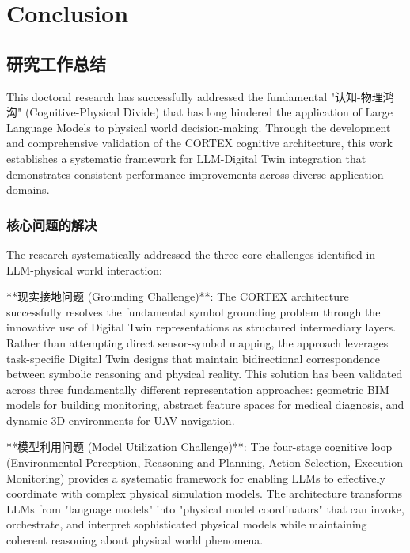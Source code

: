 
\chapter{Conclusion} \label{chp:conclusion}


\section{研究工作总结}

This doctoral research has successfully addressed the fundamental "认知-物理鸿沟" (Cognitive-Physical Divide) that has long hindered the application of Large Language Models to physical world decision-making. Through the development and comprehensive validation of the CORTEX cognitive architecture, this work establishes a systematic framework for LLM-Digital Twin integration that demonstrates consistent performance improvements across diverse application domains.

\subsection{核心问题的解决}

The research systematically addressed the three core challenges identified in LLM-physical world interaction:

**现实接地问题 (Grounding Challenge)**: The CORTEX architecture successfully resolves the fundamental symbol grounding problem through the innovative use of Digital Twin representations as structured intermediary layers. Rather than attempting direct sensor-symbol mapping, the approach leverages task-specific Digital Twin designs that maintain bidirectional correspondence between symbolic reasoning and physical reality. This solution has been validated across three fundamentally different representation approaches: geometric BIM models for building monitoring, abstract feature spaces for medical diagnosis, and dynamic 3D environments for UAV navigation.

**模型利用问题 (Model Utilization Challenge)**: The four-stage cognitive loop (Environmental Perception, Reasoning and Planning, Action Selection, Execution Monitoring) provides a systematic framework for enabling LLMs to effectively coordinate with complex physical simulation models. The architecture transforms LLMs from "language models" into "physical model coordinators" that can invoke, orchestrate, and interpret sophisticated physical models while maintaining coherent reasoning about physical world phenomena.

